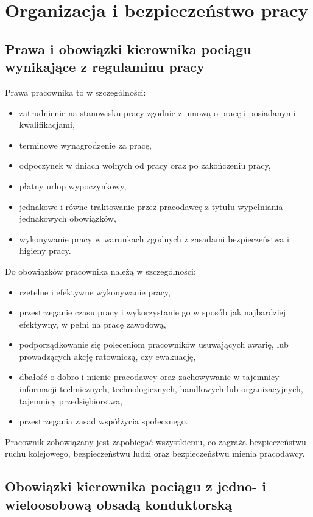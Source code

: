 \part{Organizacja i bezpieczeństwo pracy}
\chapter{Prawa i obowiązki kierownika pociągu wynikające z regulaminu pracy}
Prawa pracownika to w szczególności:
\begin{itemize}
	\item zatrudnienie na stanowisku pracy zgodnie z umową o pracę i posiadanymi kwalifikacjami,
	\item terminowe wynagrodzenie za pracę, 
	\item odpoczynek w dniach wolnych od pracy oraz po zakończeniu pracy, 
	\item płatny urlop wypoczynkowy, 
	\item jednakowe i równe traktowanie przez pracodawcę z tytułu wypełniania jednakowych obowiązków, 
	\item wykonywanie pracy w warunkach zgodnych z zasadami bezpieczeństwa i higieny pracy.
\end{itemize}
Do obowiązków pracownika należą w szczególności:

\begin{itemize}
	\item rzetelne i efektywne wykonywanie pracy,
	\item przestrzeganie czasu pracy i wykorzystanie go w sposób jak najbardziej efektywny, w pełni na pracę zawodową,
	\item podporządkowanie się poleceniom pracowników usuwających awarię, lub prowadzących akcję ratowniczą, czy ewakuację,
	\item dbałość o dobro i mienie pracodawcy oraz zachowywanie w tajemnicy informacji technicznych, technologicznych, handlowych lub organizacyjnych, tajemnicy przedsiębiorstwa,
	\item przestrzegania zasad współżycia społecznego.
\end{itemize}
     Pracownik zobowiązany jest zapobiegać wszystkiemu, co zagraża bezpieczeństwu ruchu kolejowego, bezpieczeństwu ludzi oraz bezpieczeństwu mienia pracodawcy. 

\chapter{Obowiązki kierownika pociągu z jedno- i wieloosobową obsadą konduktorską}

